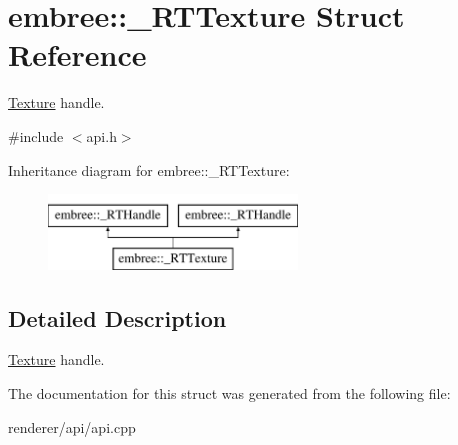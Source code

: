 \hypertarget{structembree_1_1___r_t_texture}{
\section{embree::\_\-RTTexture Struct Reference}
\label{structembree_1_1___r_t_texture}
}


\hyperlink{classembree_1_1_texture}{Texture} handle.  




{\ttfamily \#include $<$api.h$>$}

Inheritance diagram for embree::\_\-RTTexture:\begin{figure}[H]
\begin{center}
\leavevmode
\includegraphics[height=2.000000cm]{structembree_1_1___r_t_texture}
\end{center}
\end{figure}


\subsection{Detailed Description}
\hyperlink{classembree_1_1_texture}{Texture} handle. 

The documentation for this struct was generated from the following file:\begin{DoxyCompactItemize}
\item 
renderer/api/api.cpp\end{DoxyCompactItemize}
